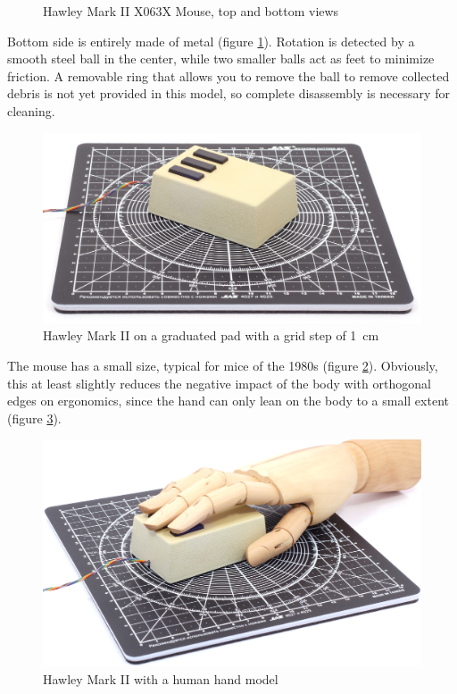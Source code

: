 \documentclass[11pt, a4paper]{article}
\begin{document}
\begin{figure}[h]
    \caption{Hawley Mark II X063X Mouse, top and bottom views}
    \label{fig:HawleyMarkIITopAndBottom}
\end{figure}



Bottom side is entirely made of metal (figure \ref{fig:HawleyMarkIITopAndBottom}). Rotation is detected by a smooth steel ball in the center, while two smaller balls act as feet to minimize friction. A removable ring that allows you to remove the ball to remove collected debris is not yet provided in this model, so complete disassembly is necessary for cleaning.

\begin{figure}[h]
    \centering
    \includegraphics[scale=0.5]{1983_hawley_mark_ii/size_30.jpg}
    \caption{Hawley Mark II on a graduated pad with a grid step of 1~cm}
    \label{fig:HawleyMarkIISize}
\end{figure}

The mouse has a small size, typical for mice of the 1980s (figure \ref{fig:HawleyMarkIISize}). Obviously, this at least slightly reduces the negative impact of the body with orthogonal edges on ergonomics, since the hand can only lean on the body to a small extent (figure \ref{fig:HawleyMarkIIHand}).

\begin{figure}[h]
    \centering
    \includegraphics[scale=0.5]{1983_hawley_mark_ii/hand_60.jpg}
    \caption{Hawley Mark II with a human hand model}
    \label{fig:HawleyMarkIIHand}
\end{figure}
\end{document}
